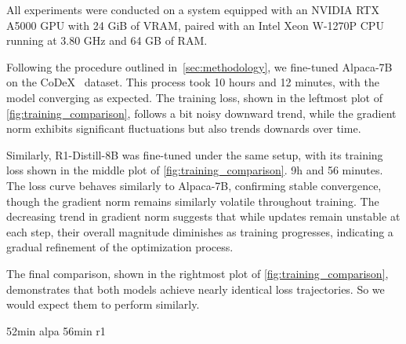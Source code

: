 \documentclass[12pt,a4paper]{article}
\newcommand{\modelalpaca}{Alpaca-7B\xspace}
\newcommand{\modeldeepseek}{R1-Distill-8B\xspace}
\begin{document}
All experiments were conducted on a system equipped with an NVIDIA RTX A5000 GPU with 24 GiB of VRAM, paired with an Intel Xeon W-1270P CPU running at 3.80 GHz and 64 GB of RAM.




Following the procedure outlined in~\cref{sec:methodology}, we fine-tuned \modelalpaca on the CoDeX~\cite{safavi2020codex} dataset.
This process took 10 hours and 12 minutes, with the model converging as expected.
The training loss, shown in the leftmost plot of \cref{fig:training_comparison}, follows a bit noisy downward trend, while the gradient norm exhibits significant fluctuations but also trends downards over time.

Similarly, \modeldeepseek was fine-tuned under the same setup, with its training loss shown in the middle plot of \cref{fig:training_comparison}.
9h and 56 minutes.
The loss curve behaves similarly to \modelalpaca, confirming stable convergence, though the gradient norm remains similarly volatile throughout training.
The decreasing trend in gradient norm suggests that while updates remain unstable at each step, their overall magnitude diminishes as training progresses, indicating a gradual refinement of the optimization process.

The final comparison, shown in the rightmost plot of \cref{fig:training_comparison}, demonstrates that both models achieve nearly identical loss trajectories.
So we would expect them to perform similarly.



52min alpa
56min r1
\end{document}
